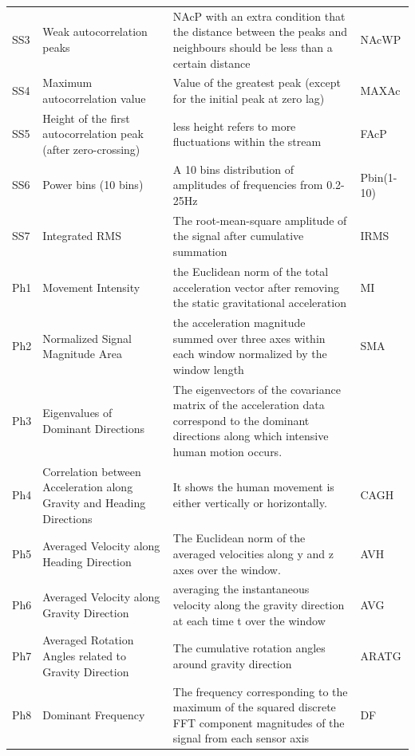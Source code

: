 \documentclass[journal,article,submit,moreauthors,pdftex]{Definitions/mdpi}
\begin{document}
\begin{table}[H]
\begin{tabular}{p{0.9cm}p{5cm}p{7cm}p{1.3cm}}
		{\footnotesize SS3}&Weak autocorrelation peaks&{\scriptsize NAcP with an extra condition that the distance between the peaks and neighbours should be less than a certain distance} & NAcWP \\
		{\footnotesize SS4}&Maximum autocorrelation value&{\scriptsize Value of the greatest peak (except for the initial peak at zero lag)} & MAXAc \\
		{\footnotesize SS5}&Height of the first autocorrelation peak (after zero-crossing)&{\scriptsize less height refers to more fluctuations within the stream  } & FAcP \\
		{\footnotesize SS6}&Power bins (10 bins)&{\scriptsize A 10 bins distribution of amplitudes of frequencies from 0.2-25Hz    } & Pbin(1-10) \\
		{\footnotesize SS7}&Integrated RMS&{\scriptsize The root-mean-square amplitude of the signal after cumulative summation } & IRMS \\
		Ph1&Movement Intensity&{\scriptsize the Euclidean norm of the total acceleration vector after removing the static gravitational acceleration } & MI\\
		Ph2&Normalized Signal Magnitude Area&{\scriptsize the acceleration magnitude summed over three axes within each window normalized by the window length } & SMA \\
		Ph3&Eigenvalues of Dominant Directions&{\scriptsize The eigenvectors of the covariance matrix of the acceleration data correspond to the dominant directions along which intensive human motion occurs.} & \\
		Ph4&Correlation between Acceleration along Gravity and Heading Directions&{\scriptsize It shows the human movement is either vertically or horizontally. } &CAGH \\
		Ph5&Averaged Velocity along Heading Direction&{\scriptsize The Euclidean norm of the averaged velocities along y and z axes over the window.} &AVH \\
		Ph6&Averaged Velocity along Gravity Direction&{\scriptsize averaging the instantaneous velocity along the gravity direction at each time t over the window } & AVG \\
		Ph7&Averaged Rotation Angles related to Gravity Direction&{\scriptsize The cumulative rotation angles around gravity direction} & ARATG \\
		Ph8&Dominant Frequency&{\scriptsize The frequency corresponding to the maximum of the squared discrete FFT component magnitudes of the signal from each sensor axis} & DF \\

\end{tabular}
\end{table}
\end{document}
